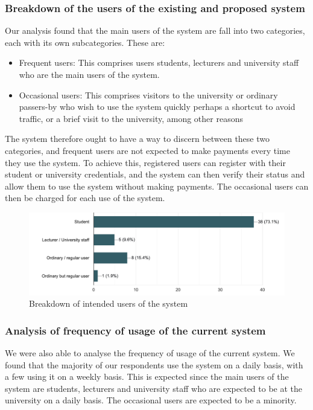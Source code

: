 \subsubsection{Breakdown of the users of the existing and proposed system}
Our analysis found that the main users of the system are fall into two categories, each with its own subcategories. These are:
\begin{itemize}
    \item Frequent users: This comprises users students, lecturers and university staff who are the main users of the system.
    \item Occasional users: This comprises visitors to the university or ordinary passers-by who wish to use the system quickly perhaps a shortcut to avoid traffic, or a brief visit to the university, among other reasons
\end{itemize}
The system therefore ought to have a way to discern between these two categories, and frequent users are not expected to make payments every time they use the system. To achieve this, registered users can register with their student or university credentials, and the system can then verify their status and allow them to use the system without making payments. The occasional users can then be charged for each use of the system.



\begin{figure}[h]
    \hspace{-1cm}
    \includegraphics[scale = 0.5]{images/users}
    \caption{Breakdown of intended users of the system}
\end{figure}

\clearpage

\subsubsection{Analysis of frequency of usage of the current system}
We were also able to analyse the frequency of usage of the current system. We found that the majority of our respondents use the system on a daily basis, with a few using it on a weekly basis. This is expected since the main users of the system are students, lecturers and university staff who are expected to be at the university on a daily basis. The occasional users are expected to be a minority.


